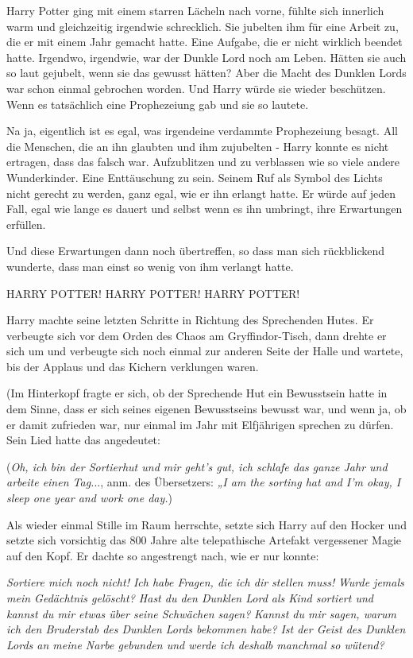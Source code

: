 Harry Potter ging mit einem starren Lächeln nach vorne, fühlte sich innerlich
warm und gleichzeitig irgendwie schrecklich. Sie jubelten ihm für eine Arbeit
zu, die er mit einem Jahr gemacht hatte. Eine Aufgabe, die er nicht wirklich
beendet hatte. Irgendwo, irgendwie, war der Dunkle Lord noch am Leben. Hätten
sie auch so laut gejubelt, wenn sie das gewusst hätten? Aber die Macht des
Dunklen Lords war schon einmal gebrochen worden. Und Harry würde sie wieder
beschützen. Wenn es tatsächlich eine Prophezeiung gab und sie so lautete.

Na ja, eigentlich ist es egal, was irgendeine verdammte Prophezeiung besagt. All
die Menschen, die an ihn glaubten und ihm zujubelten - Harry konnte es nicht
ertragen, dass das falsch war. Aufzublitzen und zu verblassen wie so viele
andere Wunderkinder. Eine Enttäuschung zu sein. Seinem Ruf als Symbol des Lichts
nicht gerecht zu werden, ganz egal, wie er ihn erlangt hatte. Er würde auf jeden
Fall, egal wie lange es dauert und selbst wenn es ihn umbringt, ihre Erwartungen
erfüllen.

Und diese Erwartungen dann noch übertreffen, so dass man sich rückblickend
wunderte, dass man einst so wenig von ihm verlangt hatte.

\glqq HARRY POTTER! HARRY POTTER! HARRY POTTER!\grqq{}

Harry machte seine letzten Schritte in Richtung des Sprechenden Hutes. Er
verbeugte sich vor dem Orden des Chaos am Gryffindor-Tisch, dann drehte er sich
um und verbeugte sich noch einmal zur anderen Seite der Halle und wartete, bis
der Applaus und das Kichern verklungen waren.

(Im Hinterkopf fragte er sich, ob der Sprechende Hut ein Bewusstsein hatte in
dem Sinne, dass er sich seines eigenen Bewusstseins bewusst war, und wenn ja, ob
er damit zufrieden war, nur einmal im Jahr mit Elfjährigen sprechen zu dürfen.
Sein Lied hatte das angedeutet:

(\emph{Oh, ich bin der Sortierhut und mir geht's gut, ich schlafe das ganze Jahr
und arbeite einen Tag.}.., anm. des Übersetzers: \emph{„I am the sorting hat and
I'm okay, I sleep one year and work one day.\grqq{}})

Als wieder einmal Stille im Raum herrschte, setzte sich Harry auf den Hocker und
setzte sich vorsichtig das 800 Jahre alte telepathische Artefakt vergessener
Magie auf den Kopf. Er dachte so angestrengt nach, wie er nur konnte:

\emph{Sortiere mich noch nicht! Ich habe Fragen, die ich dir stellen muss!}
\emph{Wurde jemals mein Gedächtnis gelöscht? Hast du den Dunklen Lord als Kind
sortiert und kannst du mir etwas über seine Schwächen sagen? } \emph{Kannst du
mir sagen, warum ich den Bruderstab des Dunklen Lords bekommen habe? } \emph{Ist
der Geist des Dunklen Lords an meine Narbe gebunden und werde ich deshalb
manchmal so wütend? }

